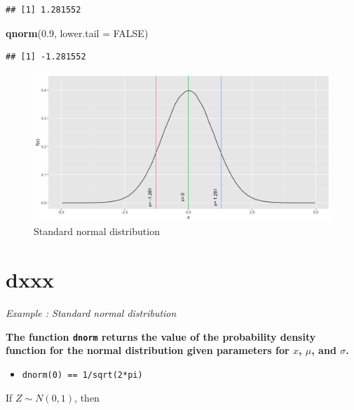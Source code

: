 \documentclass[]{book}
\newenvironment{Shaded}{\begin{snugshade}}{\end{snugshade}}
\newcommand{\DataTypeTok}[1]{\textcolor[rgb]{0.13,0.29,0.53}{#1}}
\newcommand{\FloatTok}[1]{\textcolor[rgb]{0.00,0.00,0.81}{#1}}
\newcommand{\KeywordTok}[1]{\textcolor[rgb]{0.13,0.29,0.53}{\textbf{#1}}}
\newcommand{\NormalTok}[1]{#1}
\newcommand{\OtherTok}[1]{\textcolor[rgb]{0.56,0.35,0.01}{#1}}
\providecommand{\tightlist}{%
  \setlength{\itemsep}{0pt}\setlength{\parskip}{0pt}}
\begin{document}
\begin{verbatim}
## [1] 1.281552
\end{verbatim}

\begin{Shaded}
\begin{Highlighting}[]
\KeywordTok{qnorm}\NormalTok{(}\FloatTok{0.9}\NormalTok{,  }\DataTypeTok{lower.tail =} \OtherTok{FALSE}\NormalTok{)}
\end{Highlighting}
\end{Shaded}

\begin{verbatim}
## [1] -1.281552
\end{verbatim}

\begin{figure}

{\centering \includegraphics{figure/norm3-1} 

}

\caption{Standard normal distribution}\label{fig:norm3}
\end{figure}

\hypertarget{dxxx}{%
\section{dxxx}\label{dxxx}}

\emph{Example : Standard normal distribution}

\textbf{The function \texttt{dnorm} returns the value of the probability density function for the normal distribution given parameters for \(x\), \(\mu\), and \(\sigma\).}

\begin{itemize}
\tightlist
\item
  \texttt{dnorm(0)\ ==\ 1/sqrt(2*pi)}
\end{itemize}

If \(Z\sim N(0,1)\), then
\end{document}
